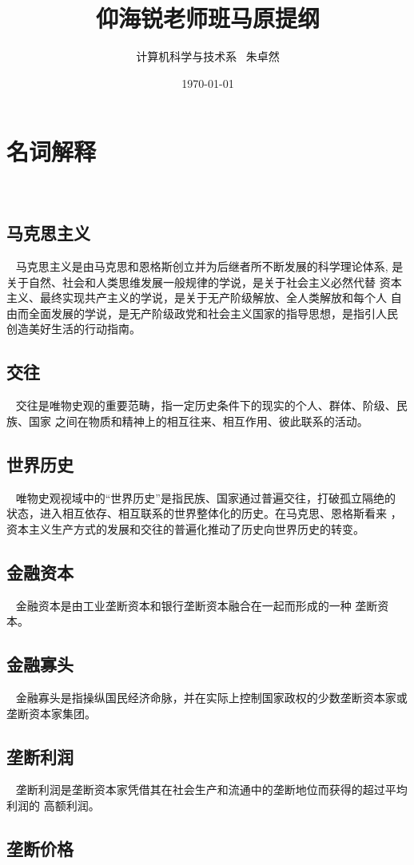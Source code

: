 \documentclass{ctexart}
\title{仰海锐老师班马原提纲}
\author{计算机科学与技术系 \ 朱卓然}
\date{\today}
\begin{document}
\maketitle

\section{名词解释}~{}
\subsection{马克思主义}~{}
马克思主义是由马克思和恩格斯创立并为后继者所不断发展的科学理论体系,
是关于自然、社会和人类思维发展一般规律的学说，是关于社会主义必然代替
资本主义、最终实现共产主义的学说，是关于无产阶级解放、全人类解放和每个人
自由而全面发展的学说，是无产阶级政党和社会主义国家的指导思想，是指引人民
创造美好生活的行动指南。

\subsection{交往}~{}
交往是唯物史观的重要范畴，指一定历史条件下的现实的个人、群体、阶级、民族、国家
之间在物质和精神上的相互往来、相互作用、彼此联系的活动。

\subsection{世界历史}~{}
唯物史观视域中的“世界历史”是指民族、国家通过普遍交往，打破孤立隔绝的
状态，进入相互依存、相互联系的世界整体化的历史。在马克思、恩格斯看来
，资本主义生产方式的发展和交往的普遍化推动了历史向世界历史的转变。

\subsection{金融资本}~{}
金融资本是由工业垄断资本和银行垄断资本融合在一起而形成的一种
垄断资本。
\subsection{金融寡头}~{}
金融寡头是指操纵国民经济命脉，并在实际上控制国家政权的少数垄断资本家或
垄断资本家集团。

\subsection{垄断利润}~{}
垄断利润是垄断资本家凭借其在社会生产和流通中的垄断地位而获得的超过平均利润的
高额利润。
\subsection{垄断价格}~{}
\end{document}
